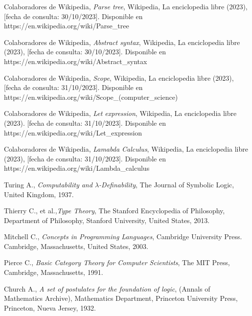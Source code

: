 \begin{thebibliography}{11}
    \bibitem{}
    \label{sec:78}
    \hypertarget{78}{}
    Colaboradores de Wikipedia, \textit{Parse tree}, Wikipedia, La enciclopedia libre (2023), [fecha de consulta: 30/10/2023]. Disponible en https://en.wikipedia.org/wiki/Parse\_tree

    \bibitem{}
    \label{sec:79}
    \hypertarget{79}{}
    Colaboradores de Wikipedia, \textit{Abstract syntax}, Wikipedia, La enciclopedia libre (2023), [fecha de consulta: 30/10/2023]. Disponible en https://en.wikipedia.org/wiki/Abstract\_syntax

    \bibitem{}
    \label{sec:80}
    \hypertarget{80}{}
    Colaboradores de Wikipedia, \textit{Scope}, Wikipedia, La enciclopedia libre (2023), [fecha de consulta: 31/10/2023]. Disponible en https://en.wikipedia.org/wiki/Scope\_(computer\_science)
    
    \bibitem{}
    \label{sec:81}
    \hypertarget{81}{}
    Colaboradores de Wikipedia, \textit{Let expression}, Wikipedia, La enciclopedia libre (2023). [fecha de consulta: 31/10/2023]. Disponible en https://en.wikipedia.org/wiki/Let\_expression

    \bibitem{}
    \label{sec:82}
    \hypertarget{82}{}
    Colaboradores de Wikipedia, \textit{Lamabda Calculus}, Wikipedia, La enciclopedia libre (2023), [fecha de consulta: 31/10/2023]. Disponible en https://en.wikipedia.org/wiki/Lambda\_calculus

    \bibitem{}
    \label{sec:83}
    \hypertarget{83}{}
    Turing A., \textit{Computability and $\lambda$-Definability}, The Journal of Symbolic Logic, United Kingdom, 1937.%

    \bibitem{}
    \label{sec:84}
    \hypertarget{84}{}
    Thierry C., et al.,\textit{Type Theory}, The Stanford Encyclopedia of Philosophy, Department of Philosophy, Stanford University, United States, 2013.
    
    \bibitem{}
    \label{sec:85}
    \hypertarget{85}{}
    Mitchell C., \textit{Concepts in Programming Languages}, Cambridge University Press. Cambridge, Massachusetts, United States, 2003. %

    \bibitem{}
    \label{sec:86}
    \hypertarget{86}{}
    Pierce C., \textit{Basic Category Theory for Computer Scientists}, The MIT Press, Cambridge, Massachusetts, 1991.  %

    \bibitem{}
    \label{sec:87}
    \hypertarget{87}{}
     Church A., \textit{A set of postulates for the foundation of logic}, (Annals of Mathematics Archive), Mathematics Department, Princeton University Press, Princeton, Nueva Jersey, 1932.%


\end{thebibliography}
